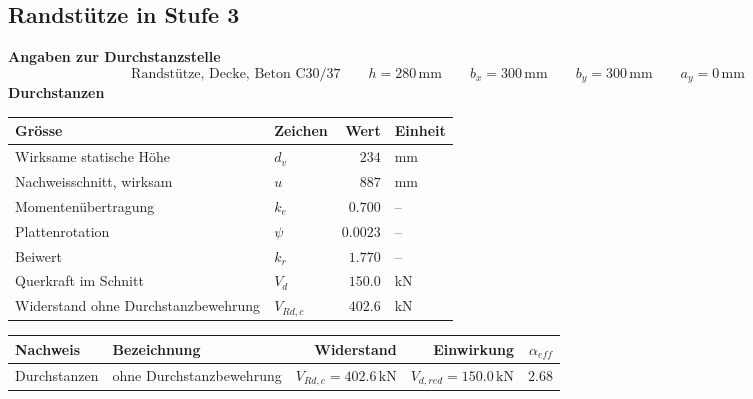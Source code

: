 \documentclass[11pt,a4paper]{article}
\begin{document}
\subsection{Randstütze in Stufe 3}
\noindent\textbf{Angaben zur Durchstanzstelle}
\begin{equation*}
\text{Randstütze, Decke, Beton C30/37} \qquad h = 280\,\mathrm{mm} \qquad b_x = 300\,\mathrm{mm} \qquad b_y = 300\,\mathrm{mm} \qquad a_y = 0\,\mathrm{mm}
\end{equation*}
\noindent\textbf{Durchstanzen}
\begin{longtable}{llrl}
\hline
Grösse & Zeichen & Wert & Einheit \\
\hline
\endhead
Wirksame statische Höhe & $d_v$ & $234$ & mm \\
Nachweisschnitt, wirksam & $u$ & $887$ & mm \\
Momentenübertragung & $k_e$ & $0.700$ & – \\
Plattenrotation & $\psi$ & $0.0023$ & – \\
Beiwert & $k_r$ & $1.770$ & – \\
Querkraft im Schnitt & $V_d$ & $150.0$ & kN \\
Widerstand ohne Durchstanzbewehrung & $V_{Rd,c}$ & $402.6$ & kN \\
\hline
\end{longtable}
\begin{xltabular}{\linewidth}{>{\raggedright\arraybackslash}X>{\raggedright\arraybackslash}Xrrr}
\hline
Nachweis & Bezeichnung & Widerstand & Einwirkung & $\alpha_{eff}$ \\
\hline
\endhead
Durchstanzen & ohne Durchstanzbewehrung & $V_{Rd,c} = 402.6\,\mathrm{kN}$ & $V_{d,red} = 150.0\,\mathrm{kN}$ & $2.68$ \\
\hline
\end{xltabular}
\end{document}
